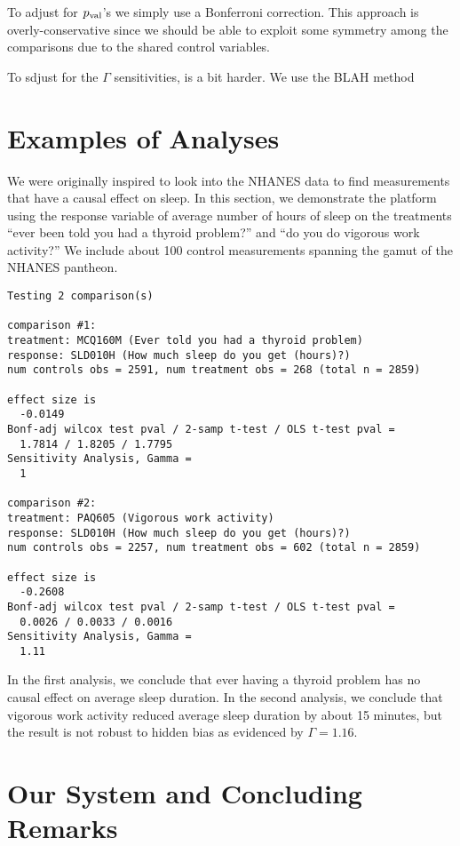 \documentclass[12pt]{article}
\begin{document}
To adjust for $p_{\text{val}}$'s we simply use a Bonferroni correction. This approach is overly-conservative since we should be able to exploit some symmetry among the comparisons due to the shared control variables.  

To sdjust for the $\Gamma$ sensitivities,  is a bit harder. We use the BLAH method

\section{Examples of Analyses}\label{sec:examples}

We were originally inspired to look into the NHANES data to find measurements that have a causal effect on sleep. In this section, we demonstrate the platform using the response variable of average number of hours of sleep on the treatments ``ever been told you had a thyroid problem?'' and ``do you do vigorous work activity?'' We include about 100 control measurements spanning the gamut of the NHANES pantheon.

\begin{verbatim}
Testing 2 comparison(s)

comparison #1:
treatment: MCQ160M (Ever told you had a thyroid problem)
response: SLD010H (How much sleep do you get (hours)?)
num controls obs = 2591, num treatment obs = 268 (total n = 2859)

effect size is
  -0.0149
Bonf-adj wilcox test pval / 2-samp t-test / OLS t-test pval =
  1.7814 / 1.8205 / 1.7795
Sensitivity Analysis, Gamma =
  1

comparison #2:
treatment: PAQ605 (Vigorous work activity)
response: SLD010H (How much sleep do you get (hours)?)
num controls obs = 2257, num treatment obs = 602 (total n = 2859)

effect size is
  -0.2608
Bonf-adj wilcox test pval / 2-samp t-test / OLS t-test pval =
  0.0026 / 0.0033 / 0.0016
Sensitivity Analysis, Gamma =
  1.11
\end{verbatim}

In the first analysis, we conclude that ever having a thyroid problem has no causal effect on average sleep duration. In the second analysis, we conclude that vigorous work activity reduced average sleep duration by about 15 minutes, but the result is not robust to hidden bias as evidenced by $\Gamma = 1.16$.

\section{Our System and Concluding Remarks}\label{sec:conclusion}
\end{document}
